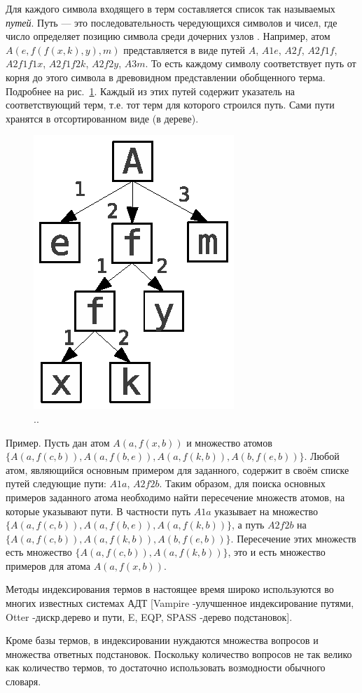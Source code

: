 Для каждого символа входящего в терм составляется список так называемых \emph{путей}. Путь --- это последовательность чередующихся символов и чисел, где число определяет позицию символа среди дочерних узлов \cite{disctree}. Например, атом $A(e,f(f(x,k),y),m)$ представляется в виде путей $A$, $A1e$, $A2f$, $A2f1f$, $A2f1f1x$, $A2f1f2k$, $A2f2y$, $A3m$. То есть каждому символу соответствует путь от корня до этого символа в древовидном представлении обобщенного терма. Подробнее на рис.~\ref{pathfig}. Каждый из этих путей содержит указатель на соответствующий терм, т.е. тот терм для которого строился путь. Сами пути хранятся в отсортированном виде (в дереве).

\begin{figure}[h]
	\centering
	\includegraphics[width=0.2\linewidth]{pics/Path1.eps}
	\caption{..}
	\label{pathfig}
\end{figure}

Пример. Пусть дан атом $A(a,f(x,b))$ и множество атомов $\{A(a,f(c,b)), A(a,f(b,e)),A(a,f(k,b)), A(b,f(e,b))\}$. Любой атом, являющийся основным примером для заданного, содержит в своём списке путей следующие пути: $A1a$, $A2f2b$. Таким образом, для поиска основных примеров заданного атома необходимо найти пересечение множеств атомов, на которые указывают пути.  В частности путь $A1a$ указывает на множество $\{A(a,f(c,b)), A(a,f(b,e)),A(a,f(k,b))\}$, а путь $A2f2b$ на $\{A(a,f(c,b)), A(a,f(k,b)), A(b,f(e,b))\}$. Пересечение этих множеств есть множество $\{A(a,f(c,b)),A(a,f(k,b))\}$, это и есть множество примеров для атома $A(a,f(x,b))$. 

Методы индексирования термов в настоящее время широко используются во многих известных системах АДТ [Vampire -улучшенное индексирование путями, Otter -дискр.дерево и пути, E, EQP, SPASS -дерево подстановок].

Кроме базы термов, в индексировании нуждаются множества вопросов и множества ответных подстановок. Поскольку количество вопросов не так велико как количество термов, то достаточно использовать возмодности обычного словаря.

